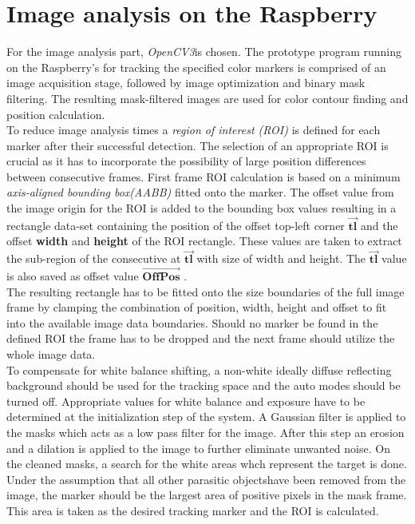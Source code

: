 \section{Image analysis on the Raspberry}
For the image analysis part, \textit{OpenCV3}is chosen. 
The prototype program running on the Raspberry's for tracking the specified color markers is comprised of an image acquisition stage, followed by image optimization and binary mask filtering. The resulting mask-filtered images are used for color contour finding and position calculation.\\
To reduce image analysis times a \textit{region of interest (ROI)} is defined for each marker after their successful detection. The selection of an appropriate ROI is crucial as it has to incorporate the possibility of large position differences between consecutive frames.
First frame ROI calculation is based on a minimum \textit{axis-aligned bounding box(AABB)} fitted onto the marker. The offset value from the image origin for the ROI is added to the bounding box values resulting in a rectangle data-set containing the position of the offset top-left corner $\vec{\mathbf{tl}}$ and the offset \textbf{width} and \textbf{height} of the ROI rectangle.
These values are taken to extract the sub-region of the consecutive at $\vec{\mathbf{tl}}$ with size of width and height. The $\vec{\mathbf{tl}}$ value is also saved as offset value $\vec{\mathbf{OffPos}}$ .\\The resulting rectangle has to be fitted onto the size boundaries of the full image frame by clamping the combination of position, width, height and offset to fit into the available image data boundaries.
Should no marker be found in the defined ROI the frame has to be dropped and the next frame should utilize the whole image data.\\
To compensate for white balance shifting, a non-white ideally diffuse reflecting background should be used for the tracking space and the auto modes should be turned off. Appropriate values for white balance and exposure have to be determined at the initialization step of the system. A Gaussian filter is applied to the masks which acts as a low pass filter for the image. After this step an erosion and a dilation\cite[chapter~3.11-12]{Davies.2017} is applied to the image to further eliminate unwanted noise.
On the cleaned masks, a search for the white areas whch represent the target is done. Under the assumption that all other parasitic objectshave been removed from the image, the marker should be the largest area of positive pixels in the mask frame. This area is taken as the desired tracking marker and the ROI is calculated.
